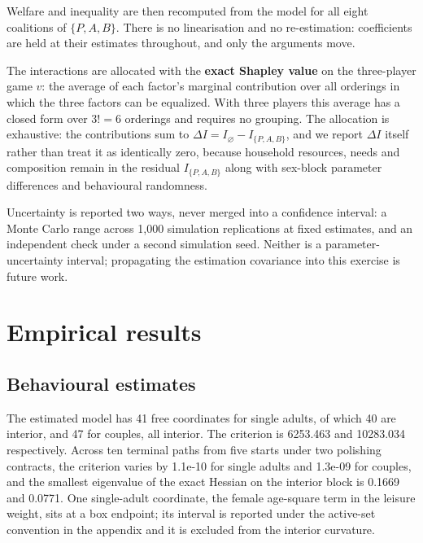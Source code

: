 \documentclass[11pt,a4paper]{article}
\begin{document}
Welfare and inequality are then recomputed from the model for all eight coalitions of \(\{P,A,B\}\). There is no linearisation and no re-estimation: coefficients are held at their estimates throughout, and only the arguments move.

The interactions are allocated with the \textbf{exact Shapley value} \citep{shorrocks2013} on the three-player game \(v\): the average of each factor's marginal contribution over all orderings in which the three factors can be equalized. With three players this average has a closed form over \(3!=6\) orderings and requires no grouping. The allocation is exhaustive: the contributions sum to \(\Delta I=I_\varnothing-I_{\{P,A,B\}}\), and we report \(\Delta I\) itself rather than treat it as identically zero, because household resources, needs and composition remain in the residual \(I_{\{P,A,B\}}\) along with sex-block parameter differences and behavioural randomness.

Uncertainty is reported two ways, never merged into a confidence interval: a Monte Carlo range across 1,000 simulation replications at fixed estimates, and an independent check under a second simulation seed. Neither is a parameter-uncertainty interval; propagating the estimation covariance into this exercise is future work.

\section{Empirical results}\label{empirical-results}

\subsection{Behavioural estimates}\label{behavioural-estimates}

The estimated model has 41 free coordinates for single adults, of which 40 are interior, and 47 for couples, all interior. The criterion is 6253.463 and 10283.034 respectively. Across ten terminal paths from five starts under two polishing contracts, the criterion varies by 1.1e-10 for single adults and 1.3e-09 for couples, and the smallest eigenvalue of the exact Hessian on the interior block is 0.1669 and 0.0771. One single-adult coordinate, the female age-square term in the leisure weight, sits at a box endpoint; its interval is reported under the active-set convention in the appendix and it is excluded from the interior curvature.
\end{document}
